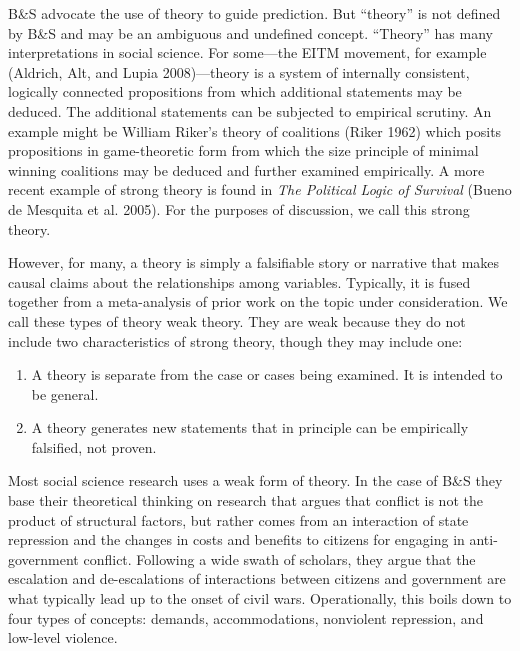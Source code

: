 \documentclass[
]{article}
\providecommand{\tightlist}{%
  \setlength{\itemsep}{0pt}\setlength{\parskip}{0pt}}
\begin{document}
B\&S advocate the use of theory to guide prediction. But ``theory'' is not defined by B\&S and may be an ambiguous and undefined concept. ``Theory'' has many interpretations in social science. For some---the EITM movement, for example (Aldrich, Alt, and Lupia 2008)---theory is a system of internally consistent, logically connected propositions from which additional statements may be deduced. The additional statements can be subjected to empirical scrutiny. An example might be William Riker's theory of coalitions (Riker 1962) which posits propositions in game-theoretic form from which the size principle of minimal winning coalitions may be deduced and further examined empirically. A more recent example of strong theory is found in \emph{The Political Logic of Survival} (Bueno de Mesquita et al. 2005). For the purposes of discussion, we call this strong theory.

However, for many, a theory is simply a falsifiable story or narrative that makes causal claims about the relationships among variables. Typically, it is fused together from a meta-analysis of prior work on the topic under consideration. We call these types of theory weak theory. They are weak because they do not include two characteristics of strong theory, though they may include one:

\begin{enumerate}
\def\labelenumi{\arabic{enumi}.}
\tightlist
\item
  A theory is separate from the case or cases being examined. It is intended to be general.
\item
  A theory generates new statements that in principle can be empirically falsified, not proven.
\end{enumerate}

Most social science research uses a weak form of theory. In the case of B\&S they base their theoretical thinking on research that argues that conflict is not the product of structural factors, but rather comes from an interaction of state repression and the changes in costs and benefits to citizens for engaging in anti-government conflict. Following a wide swath of scholars, they argue that the escalation and de-escalations of interactions between citizens and government are what typically lead up to the onset of civil wars. Operationally, this boils down to four types of concepts: demands, accommodations, nonviolent repression, and low-level violence.
\end{document}
